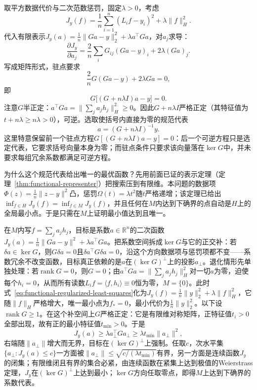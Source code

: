 取平方数据代价与二次范数惩罚，固定$\lambda>0$，考虑
\begin{equation}
  J_y(f)=\frac1n\sum_{i=1}^n(L_if-y_i)^2+\lambda\|f\|_H^2.
  \label{eq:functional-regularized-least-squares}
\end{equation}
代入有限表示$J_y(a)=\frac1n\|Ga-y\|_2^2+\lambda a^{\top}Ga$，对$a_j$求导：
\[
  \frac{\partial J_y}{\partial a_j}
  =\frac{2}{n}\sum_iG_{ij}(Ga-y)_i+2\lambda(Ga)_j.
\]
写成矩阵形式，驻点要求
\[
  \frac2nG(Ga-y)+2\lambda Ga=0,
\]
即
\[
  G\bigl[(G+n\lambda I)a-y\bigr]=0.
\]
注意$G$半正定：$a^{\top}Ga=\|\sum_ja_jh_j\|_H^2\ge0$。因此$G+n\lambda I$严格正定（其特征值为$t+n\lambda\ge n\lambda>0$），可逆。选取使括号内直接为零的规范代表
\begin{equation}
  a=(G+n\lambda I)^{-1}y.
  \label{eq:functional-tikhonov-representer}
\end{equation}
这里特意保留前一个驻点方程$G[(G+n\lambda I)a-y]=0$：后一个可逆方程只是选定代表，它要求括号向量本身为零；而驻点条件只要求该向量落在$\ker G$中，并未要求每组冗余系数都满足可逆方程。

为什么这个规范代表给出唯一的最优函数？先用前面已证的表示定理（定理~\ref{thm:functional-representer}）把搜索压到有限维。本问题的数据项$\Phi(z)=\frac1n\|z-y\|^2$凸，惩罚$\Omega(t)=\lambda t^2$随$t$严格递增；该定理已给出$\inf_{f\in H}J_y(f)=\inf_{f\in M}J_y(f)$，并且任何在$M$内达到下确界的点自动是$H$上的全局最小点。于是只需在$M$上证明最小值达到且唯一。

在$M$内写$f=\sum_ja_jh_j$，目标是系数$a\in\mathbb R^n$的二次函数$J_y(a)=\frac1n\|Ga-y\|^2+\lambda a^{\top}Ga$。把系数空间拆成$\ker G$与它的正交补：若$\delta a\in\ker G$，则$G\delta a=0$且$\delta a^{\top}G\delta a=0$，沿这个方向数据项与惩罚项都不变——系数冗余不改变函数，目标真正依赖的是$a$在$(\ker G)^\perp$上的投影$a_\perp$。退化情形先单独处理：若$\operatorname{rank}G=0$，则$G=0$；由$a^{\top}Ga=\|\sum_ja_jh_j\|_H^2$对一切$a$为零，迫使每个$h_i=0$，从而所有读数$L_if=\langle f,h_i\rangle\equiv0$恒为零，$M=\{0\}$。此时式~\eqref{eq:functional-regularized-least-squares}化为$J_y(f)=\frac1n\|y\|_2^2+\lambda\|f\|_H^2$，它随$\|f\|_H$严格增大，唯一最小点为$f_*=0$，最小代价为$\frac1n\|y\|_2^2$。以下设$\operatorname{rank}G\ge1$。在这个补空间上$G$严格正定：它是有限维对称矩阵，正特征值$t_i>0$全部出现，故有正的最小特征值$t_{\min}>0$。于是
\[
  J_y(a)\ge \lambda a_\perp^{\top}G a_\perp\ge \lambda t_{\min}\|a_\perp\|^2,
\]
右端随$\|a_\perp\|$增大而无界，目标在$(\ker G)^\perp$上强制。任取$c$，次水平集$\{a_\perp:J_y(a)\le c\}$一方面被$\|a_\perp\|\le\sqrt{c/(\lambda t_{\min})}$有界，另一方面是连续函数$J_y$的闭集；有限维闭且有界的集合必紧，由连续函数在紧集上达到极值的Weierstrass定理，$J_y$在$(\ker G)^\perp$上达到最小；$\ker G$方向任取零点，即得$M$上达到下确界的系数代表。

